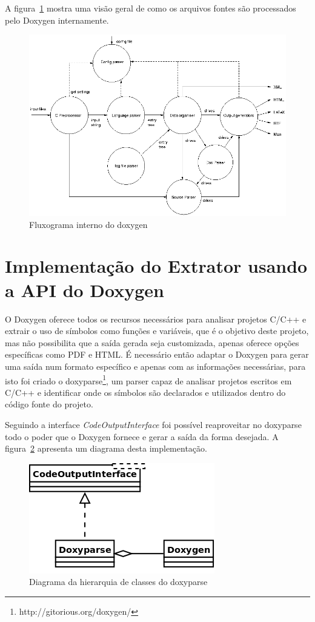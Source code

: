 A figura~\ref{fig:doxygen-internals-flow} mostra uma visão geral de como os
arquivos fontes são processados pelo Doxygen internamente.

\begin{figure}[h]
\center
\includegraphics[scale=0.5]{imagens/doxygen-internals-flow}
\caption{Fluxograma interno do doxygen\cite{doxygenInternals}}
\label{fig:doxygen-internals-flow}
\end{figure}

\section{Implementação do Extrator usando a API do Doxygen}

O Doxygen oferece todos os recursos necessários para analisar projetos C/C++ e
extrair o uso de símbolos como funções e variáveis, que é o objetivo deste
projeto, mas não possibilita que a saída gerada seja customizada, apenas
oferece opções específicas como PDF e HTML. É necessário então adaptar o
Doxygen para gerar uma saída num formato específico e apenas com as informações
necessárias, para isto foi criado o
doxyparse\footnote{http://gitorious.org/doxygen/}, um parser capaz de analisar
projetos escritos em C/C++ e identificar onde os símbolos são declarados e
utilizados dentro do código fonte do projeto.

Seguindo a interface {\it CodeOutputInterface} foi possível reaproveitar no
doxyparse todo o poder que o Doxygen fornece e gerar a saída da forma desejada.
A figura~\ref{doxyparse-diagram} apresenta um diagrama desta implementação.

\begin{figure}[h]
\center
\includegraphics[scale=0.4]{imagens/doxyparse-diagram}
\caption{Diagrama da hierarquia de classes do doxyparse}
\label{doxyparse-diagram}
\end{figure}

